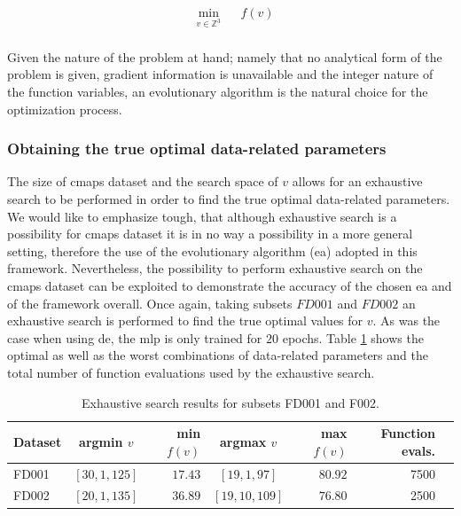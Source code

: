 \begin{equation}
\begin{aligned}
& \underset{v \in \mathbb{Z}^3}{\text{min}}
& & f(v) \\
\end{aligned}
\label{eq:optimization_problem}
\end{equation}

Given the nature of the problem at hand; namely that no analytical form of the problem is given, gradient information is unavailable and the integer nature of the function variables, an evolutionary algorithm is the natural choice for the optimization process.

\subsubsection{Obtaining the true optimal data-related parameters}

The size of \gls{cmaps} dataset and the search space of $v$ allows for an exhaustive search to be performed in order to find the true optimal data-related parameters. We would like to emphasize tough, that although exhaustive search is a possibility for \gls{cmaps} dataset it is in no way a possibility in a more general setting, therefore the use of the evolutionary algorithm (\gls{ea}) adopted in this framework. Nevertheless, the possibility to perform exhaustive search on the \gls{cmaps} dataset can be exploited to demonstrate the accuracy of the chosen \gls{ea} and of the framework overall. Once again, taking subsets $FD001$ and $FD002$ an exhaustive search is performed to find the true optimal values for $v$. As was the case when using \gls{de}, the \gls{mlp} is only trained for $20$ epochs. Table \ref{table:true_optimal_data_params} shows the optimal as well as the worst combinations of data-related parameters and the total number of function evaluations used by the exhaustive search.

\begin{table}[!htb]
\centering
\begin{tabular}{l | c r c r r l}
	\hline
	 Dataset & argmin $v$ & min $f(v)$ & argmax $v$ & max $f(v)$ & Function evals.\\
  	\hline
  	FD001 & $\left[ 30, 1, 125 \right]$ & $17.43$ & $\left[ 19, 1, 97 \right]$ & $80.92$ & 7500\\
  	FD002 & $\left[ 20, 1, 135 \right]$ & $36.89$ & $\left[ 19, 10, 109 \right]$ & $76.80$ & 2500\\
  	\hline
\end{tabular}
\caption{Exhaustive search results for subsets FD001 and F002.}
\label{table:true_optimal_data_params}
\end{table}


